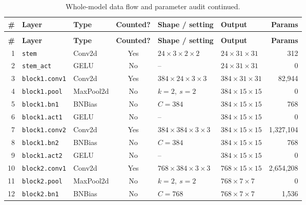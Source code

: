 \documentclass[11pt]{article}
\begin{document}
\begin{longtable}{@{}r
>{\raggedright\arraybackslash}p{}
>{\raggedright\arraybackslash}p{}
c
>{\raggedright\arraybackslash}p{}
>{\raggedright\arraybackslash}p{}
r@{}}
\label{tab:layerdata}\\
\toprule
\rowcolor{gray!18}
\textbf{\#} & \textbf{Layer} & \textbf{Type} & \textbf{Counted?} &
\textbf{Shape / setting} & \textbf{Output} & \textbf{Params} \\
\midrule
\endfirsthead
\caption[]{Whole-model data flow and parameter audit continued.}\\
\toprule
\rowcolor{gray!18}
\textbf{\#} & \textbf{Layer} & \textbf{Type} & \textbf{Counted?} &
\textbf{Shape / setting} & \textbf{Output} & \textbf{Params} \\
\midrule
\endhead
\bottomrule
\endfoot
\bottomrule
\endlastfoot
\rowcolor{gray!5}
1 & \texttt{stem} & Conv2d & Yes & $24{\times}3{\times}2{\times}2$ &
$24{\times}31{\times}31$ & 312 \\
2 & \texttt{stem\_act} & GELU & No & -- &
$24{\times}31{\times}31$ & 0 \\
\rowcolor{gray!5}
3 & \texttt{block1.conv1} & Conv2d & Yes & $384{\times}24{\times}3{\times}3$ &
$384{\times}31{\times}31$ & 82,944 \\
4 & \texttt{block1.pool} & MaxPool2d & No & $k{=}2,\ s{=}2$ &
$384{\times}15{\times}15$ & 0 \\
\rowcolor{gray!5}
5 & \texttt{block1.bn1} & BNBias & No & $C{=}384$ &
$384{\times}15{\times}15$ & 768 \\
6 & \texttt{block1.act1} & GELU & No & -- &
$384{\times}15{\times}15$ & 0 \\
\rowcolor{gray!5}
7 & \texttt{block1.conv2} & Conv2d & Yes & $384{\times}384{\times}3{\times}3$ &
$384{\times}15{\times}15$ & 1,327,104 \\
8 & \texttt{block1.bn2} & BNBias & No & $C{=}384$ &
$384{\times}15{\times}15$ & 768 \\
\rowcolor{gray!5}
9 & \texttt{block1.act2} & GELU & No & -- &
$384{\times}15{\times}15$ & 0 \\
10 & \texttt{block2.conv1} & Conv2d & Yes & $768{\times}384{\times}3{\times}3$ &
$768{\times}15{\times}15$ & 2,654,208 \\
\rowcolor{gray!5}
11 & \texttt{block2.pool} & MaxPool2d & No & $k{=}2,\ s{=}2$ &
$768{\times}7{\times}7$ & 0 \\
12 & \texttt{block2.bn1} & BNBias & No & $C{=}768$ &
$768{\times}7{\times}7$ & 1,536 \\

\end{longtable}
\end{document}
